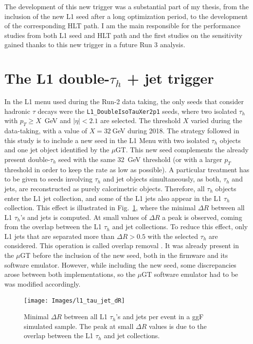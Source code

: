 \documentclass[../main.tex]{subfiles}
\begin{document}
The development of this new trigger was a substantial part of my thesis, from the inclusion of the new L1 seed after a long optimization period, to the development of the corresponding HLT path. I am the main responsible for the performance studies from both L1 seed and HLT path and the first studies on the sensitivity gained thanks to this new trigger in a future Run 3 \hhbbtt{} analysis.




\section{The L1 double-$\tau_h$ + jet trigger}
\label{hh:sec:l1seeds}

In the L1 menu used during the Run-2 data taking, the only seeds that consider hadronic $\tau$ decays were the \texttt{L1\_DoubleIsoTauXer2p1} seeds, where two isolated $\tau_h$ with $p_T\geq X$~GeV and $|\eta|<2.1$ are selected. The threshold $X$ varied during the data-taking, with a value of $X=32~$GeV during 2018. The strategy followed in this study is to include a new seed in the L1 Menu with two isolated $\tau_h$ objects and one jet object identified by the $\mu$GT. This new seed complements the already present double-$\tau_h$ seed with the same 32~GeV threshold (or with a larger $p_T$ threshold in order to keep the rate as low as possible). A particular treatment has to be given to seeds involving $\tau_h$ and jet objects simultaneously, as both, $\tau_h$ and jets, are reconstructed as purely calorimetric objects. Therefore, all $\tau_h$ objects enter the L1 jet collection, and some of the L1 jets also appear in the L1 $\tau_h$ collection. This effect is illustrated in Fig.~\ref{hh:fig:l1_tau_jet_dR}, where the minimal $\Delta R$ between all L1 $\tau_h$'s and jets is computed. At small values of $\Delta R$ a peak is observed, coming from the overlap between the L1 $\tau_h$ and jet collections. To reduce this effect, only L1 jets that are separated more than $\Delta R>0.5$ with the selected $\tau_h$ are considered. This operation is called overlap removal \cite{intro:l1_13tev}. It was already present in the $\mu$GT before the inclusion of the new seed, both in the firmware and its software emulator. However, while including the new seed, some discrepancies arose between both implementations, so the $\mu$GT software emulator had to be was modified accordingly.

\begin{figure}[h!]
\begin{center}
\texttt{[image: Images/l1\_tau\_jet\_dR]}
\end{center}
\caption[Minimal $\Delta R$ between all L1 $\tau_h$'s and jets per event]{Minimal $\Delta R$ between all L1 $\tau_h$'s and jets per event in a \htt{} ggF simulated sample. The peak at small $\Delta R$ values is due to the overlap between the L1 $\tau_h$ and jet collections.}
\label{hh:fig:l1_tau_jet_dR}
\end{figure}
\end{document}
